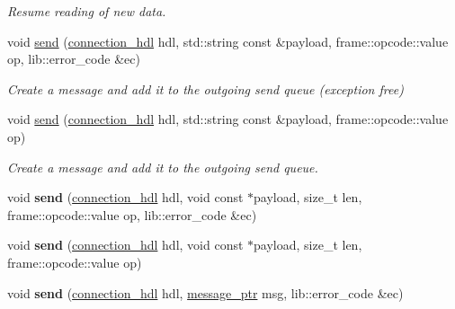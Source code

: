 \begin{DoxyCompactItemize}
\begin{DoxyCompactList}\small\item\em Resume reading of new data. \end{DoxyCompactList}\item 
void \hyperlink{classwebsocketpp_1_1endpoint_a5341f59de7ef1a565a2fd93daba212d5}{send} (\hyperlink{namespacewebsocketpp_a6b3d26a10ee7229b84b776786332631d}{connection\+\_\+hdl} hdl, std\+::string const \&payload, frame\+::opcode\+::value op, lib\+::error\+\_\+code \&ec)
\begin{DoxyCompactList}\small\item\em Create a message and add it to the outgoing send queue (exception free) \end{DoxyCompactList}\item 
void \hyperlink{classwebsocketpp_1_1endpoint_a9eb8f9fd7fbb7d8374eb02e100430bcf}{send} (\hyperlink{namespacewebsocketpp_a6b3d26a10ee7229b84b776786332631d}{connection\+\_\+hdl} hdl, std\+::string const \&payload, frame\+::opcode\+::value op)
\begin{DoxyCompactList}\small\item\em Create a message and add it to the outgoing send queue. \end{DoxyCompactList}\item 
void {\bfseries send} (\hyperlink{namespacewebsocketpp_a6b3d26a10ee7229b84b776786332631d}{connection\+\_\+hdl} hdl, void const $\ast$payload, size\+\_\+t len, frame\+::opcode\+::value op, lib\+::error\+\_\+code \&ec)\hypertarget{classwebsocketpp_1_1endpoint_a71e4454af8d8f133ca736e80c3adf268}{}\label{classwebsocketpp_1_1endpoint_a71e4454af8d8f133ca736e80c3adf268}

\item 
void {\bfseries send} (\hyperlink{namespacewebsocketpp_a6b3d26a10ee7229b84b776786332631d}{connection\+\_\+hdl} hdl, void const $\ast$payload, size\+\_\+t len, frame\+::opcode\+::value op)\hypertarget{classwebsocketpp_1_1endpoint_adc03a5bd5797a54fde64afd279032671}{}\label{classwebsocketpp_1_1endpoint_adc03a5bd5797a54fde64afd279032671}

\item 
void {\bfseries send} (\hyperlink{namespacewebsocketpp_a6b3d26a10ee7229b84b776786332631d}{connection\+\_\+hdl} hdl, \hyperlink{classwebsocketpp_1_1endpoint_a585ecbbfd9689d4e4229e4c8378bd672}{message\+\_\+ptr} msg, lib\+::error\+\_\+code \&ec)\hypertarget{classwebsocketpp_1_1endpoint_a5cad5b7944435e7eec248e98e7e7a912}{}\label{classwebsocketpp_1_1endpoint_a5cad5b7944435e7eec248e98e7e7a912}


\end{DoxyCompactItemize}
